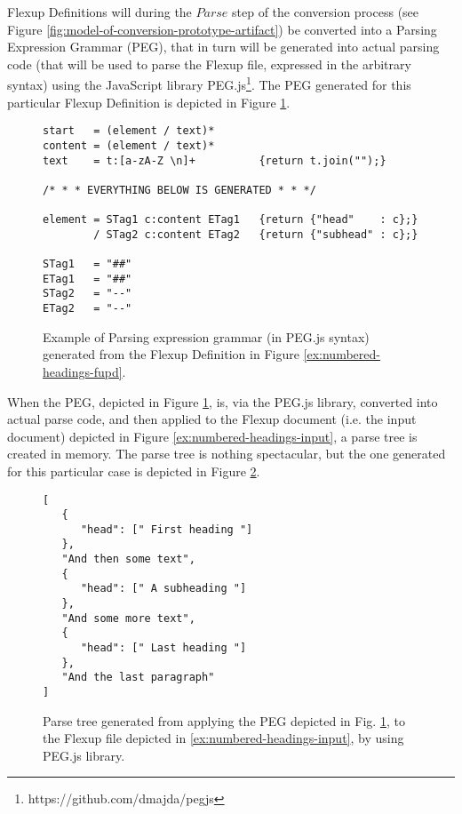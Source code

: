 \documentclass{scrreprt}
\begin{document}
Flexup Definitions will during the $Parse$ step of the conversion process (see Figure \ref{fig:model-of-conversion-prototype-artifact}) be converted into a Parsing Expression Grammar (PEG), that in turn will be generated into actual parsing code (that will be used to parse the Flexup file, expressed in the arbitrary syntax) using the JavaScript library PEG.js\footnote{https://github.com/dmajda/pegjs}. The PEG generated for this particular Flexup Definition is depicted in Figure \ref{ex:peg-grammar}.


\begin{figure}[h]
\centering
\begin{lstlisting}
start   = (element / text)*
content = (element / text)*
text    = t:[a-zA-Z \n]+          {return t.join("");}

/* * * EVERYTHING BELOW IS GENERATED * * */

element = STag1 c:content ETag1   {return {"head"    : c};}
        / STag2 c:content ETag2   {return {"subhead" : c};}

STag1   = "##"
ETag1   = "##"
STag2   = "--"
ETag2   = "--"
\end{lstlisting}
\caption{Example of Parsing expression grammar (in PEG.js syntax) generated from the Flexup Definition in Figure \ref{ex:numbered-headings-fupd}.}
\label{ex:peg-grammar}
\end{figure}

When the PEG, depicted in Figure \ref{ex:peg-grammar}, is, via the PEG.js library, converted into actual parse code, and then applied to the Flexup document (i.e. the input document) depicted in Figure \ref{ex:numbered-headings-input}, a parse tree is created in memory. The parse tree is nothing spectacular, but the one generated for this particular case is depicted in Figure \ref{ex:generated-parse-tree}.

\begin{figure}[h]
\begin{lstlisting}
[
   {
      "head": [" First heading "]
   },
   "And then some text",
   {
      "head": [" A subheading "]
   },
   "And some more text",
   {
      "head": [" Last heading "]
   },
   "And the last paragraph"
]
\end{lstlisting}
\caption{Parse tree generated from applying the PEG depicted in Fig. \ref{ex:peg-grammar}, to the Flexup file depicted in \ref{ex:numbered-headings-input}, by using PEG.js library.}
\label{ex:generated-parse-tree}
\end{figure}
\end{document}
